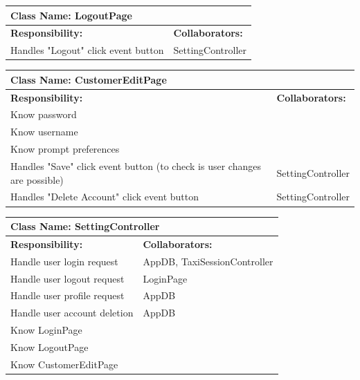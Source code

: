 \documentclass[]{article}
\begin{document}
\begin{table}[H]
\centering
\begin{tabular}{|p{6cm}|p{6cm}|}
\hline 
 \multicolumn{2}{|l|}{\textbf{Class Name: LogoutPage}} \\
\hline
\textbf{Responsibility:} & \textbf{Collaborators:} \\
\hline 
Handles "Logout" click event button & SettingController\\ \hline
\end{tabular}
\end{table}


\begin{table}[H]
\centering
\begin{tabular}{|p{6cm}|p{6cm}|}
\hline 
 \multicolumn{2}{|l|}{\textbf{Class Name: CustomerEditPage}} \\
\hline
\textbf{Responsibility:} & \textbf{Collaborators:} \\
\hline 
Know password & \\ \hline
Know username & \\ \hline
Know prompt preferences & \\ \hline
Handles "Save" click event button (to check is user changes are possible) & SettingController\\ \hline 
Handles "Delete Account" click event button & SettingController\\ \hline
\end{tabular}
\end{table}

\begin{table}[H]
\centering
\begin{tabular}{|p{6cm}|p{6cm}|}
\hline 
 \multicolumn{2}{|l|}{\textbf{Class Name: SettingController}} \\
\hline
\textbf{Responsibility:} & \textbf{Collaborators:} \\
\hline
Handle user login request & AppDB, TaxiSessionController\\ \hline
Handle user logout request & LoginPage\\ \hline
Handle user profile request & AppDB\\ \hline
Handle user account deletion & AppDB\\ \hline
Know LoginPage & \\ \hline 
Know LogoutPage & \\ \hline
Know CustomerEditPage & \\ \hline
\end{tabular}
\end{table}
\end{document}
